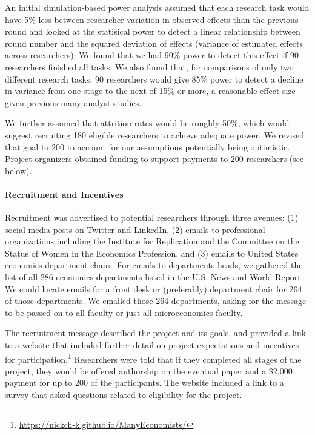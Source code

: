 \documentclass[
  letterpaper,
  DIV=11,
  numbers=noendperiod]{scrartcl}
\let\oldparagraph\paragraph
\renewcommand{\paragraph}[1]{\oldparagraph{#1}\mbox{}}
\begin{document}
An initial simulation-based power analysis assumed that each research
task would have 5\% less between-researcher variation in observed
effects than the previous round and looked at the statisical power to
detect a linear relationship between round number and the squared
deviation of effects (variance of estimated effects across researchers).
We found that we had 90\% power to detect this effect if 90 researchers
finished all tasks. We also found that, for comparisons of only two
different research tasks, 90 researchers would give 85\% power to detect
a decline in variance from one stage to the next of 15\% or more, a
reasonable effect size given previous many-analyst studies.

We further assumed that attrition rates would be roughly 50\%, which
would suggest recruiting 180 eligible researchers to achieve adequate
power. We revised that goal to 200 to account for our assumptions
potentially being optimistic. Project organizers obtained funding to
support payments to 200 researchers (see below).

\hypertarget{recruitment-and-incentives}{%
\paragraph{Recruitment and
Incentives}\label{recruitment-and-incentives}}

Recruitment was advertised to potential researchers through three
avenues: (1) social media posts on Twitter and LinkedIn, (2) emails to
professional organizations including the Institute for Replication and
the Committee on the Status of Women in the Economics Profession, and
(3) emails to United States economics department chairs. For emails to
departments heads, we gathered the list of all 286 economics departments
listed in the U.S. News and World Report. We could locate emails for a
front desk or (preferably) department chair for 264 of those
departments. We emailed those 264 departments, asking for the message to
be passed on to all faculty or just all microeconomics faculty.

The recruitment message described the project and its goals, and
provided a link to a website that included further detail on project
expectations and incentives for participation.\footnote{\url{https://nickch-k.github.io/ManyEconomists/}}
Researchers were told that if they completed all stages of the project,
they would be offered authorship on the eventual paper and a \$2,000
payment for up to 200 of the participants. The website included a link
to a survey that asked questions related to eligibility for the project.
\end{document}
